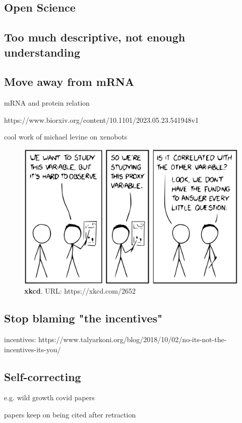 % 

\subsection{Open Science}

\subsection{Too much descriptive, not enough understanding}

\subsection{Move away from mRNA}

mRNA and protein relation

https://www.biorxiv.org/content/10.1101/2023.05.23.541948v1

cool work of michael levine on xenobots


\begin{figure}[H]
    \includegraphics[width=\linewidth]{ch.discussion/imgs/xkcd.png}
    \caption{\textbf{xkcd}. URL: https://xkcd.com/2652}
    \label{fig:xkcd}
\end{figure}

\subsection{Stop blaming "the incentives"}

incentives: https://www.talyarkoni.org/blog/2018/10/02/no-its-not-the-incentives-its-you/

\subsection{Self-correcting}

e.g. wild growth covid papers

papers keep on being cited after retraction

